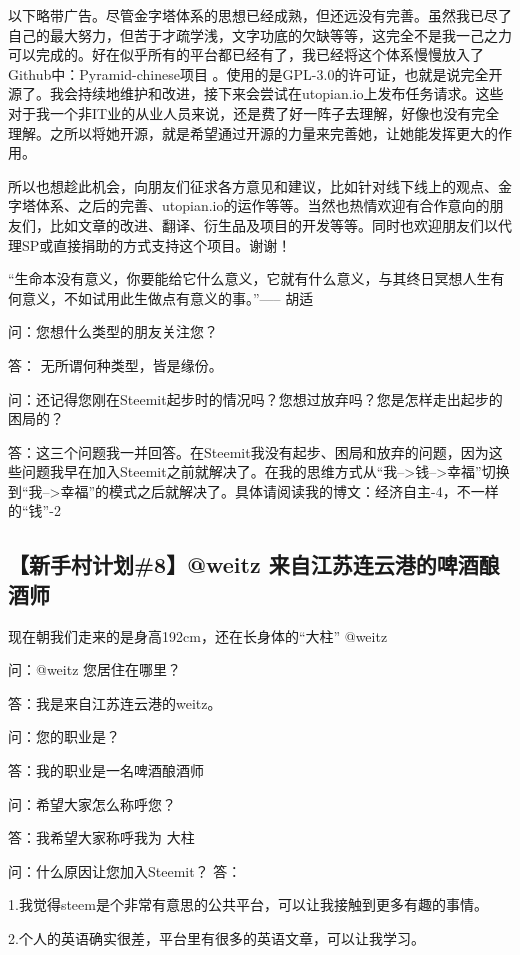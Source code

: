 \documentclass[]{ctexbook}
\begin{document}
以下略带广告。尽管金字塔体系的思想已经成熟，但还远没有完善。虽然我已尽了自己的最大努力，但苦于才疏学浅，文字功底的欠缺等等，这完全不是我一己之力可以完成的。好在似乎所有的平台都已经有了，我已经将这个体系慢慢放入了Github中：Pyramid-chinese项目 。使用的是GPL-3.0的许可证，也就是说完全开源了。我会持续地维护和改进，接下来会尝试在utopian.io上发布任务请求。这些对于我一个非IT业的从业人员来说，还是费了好一阵子去理解，好像也没有完全理解。之所以将她开源，就是希望通过开源的力量来完善她，让她能发挥更大的作用。

所以也想趁此机会，向朋友们征求各方意见和建议，比如针对线下线上的观点、金字塔体系、之后的完善、utopian.io的运作等等。当然也热情欢迎有合作意向的朋友们，比如文章的改进、翻译、衍生品及项目的开发等等。同时也欢迎朋友们以代理SP或直接捐助的方式支持这个项目。谢谢！

``生命本没有意义，你要能给它什么意义，它就有什么意义，与其终日冥想人生有何意义，不如试用此生做点有意义的事。''----- 胡适

问：您想什么类型的朋友关注您？

答： 无所谓何种类型，皆是缘份。

问：还记得您刚在Steemit起步时的情况吗？您想过放弃吗？您是怎样走出起步的困局的？

答：这三个问题我一并回答。在Steemit我没有起步、困局和放弃的问题，因为这些问题我早在加入Steemit之前就解决了。在我的思维方式从``我--\textgreater{}钱--\textgreater{}幸福''切换到``我--\textgreater{}幸福''的模式之后就解决了。具体请阅读我的博文：经济自主-4，不一样的``钱''-2

\hypertarget{8weitz-}{%
\subsection{【新手村计划\#8】@weitz 来自江苏连云港的啤酒酿酒师}\label{8weitz-}}

现在朝我们走来的是身高192cm，还在长身体的``大柱'' @weitz

问：@weitz 您居住在哪里？

答：我是来自江苏连云港的weitz。

问：您的职业是？

答：我的职业是一名啤酒酿酒师

问：希望大家怎么称呼您？

答：我希望大家称呼我为 大柱

问：什么原因让您加入Steemit？
答：

1.我觉得steem是个非常有意思的公共平台，可以让我接触到更多有趣的事情。

2.个人的英语确实很差，平台里有很多的英语文章，可以让我学习。
\end{document}
